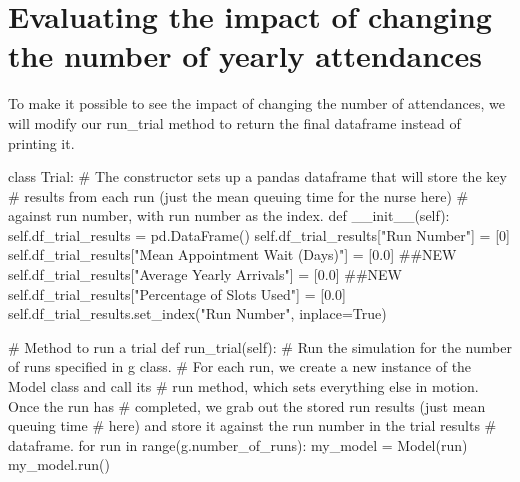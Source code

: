 \documentclass[
  letterpaper,
  DIV=11,
  numbers=noendperiod]{scrreprt}
\newenvironment{Shaded}{\begin{snugshade}}{\end{snugshade}}
\newcommand{\BuiltInTok}[1]{\textcolor[rgb]{0.00,0.23,0.31}{#1}}
\newcommand{\CommentTok}[1]{\textcolor[rgb]{0.37,0.37,0.37}{#1}}
\newcommand{\ControlFlowTok}[1]{\textcolor[rgb]{0.00,0.23,0.31}{#1}}
\newcommand{\DecValTok}[1]{\textcolor[rgb]{0.68,0.00,0.00}{#1}}
\newcommand{\FloatTok}[1]{\textcolor[rgb]{0.68,0.00,0.00}{#1}}
\newcommand{\FunctionTok}[1]{\textcolor[rgb]{0.28,0.35,0.67}{#1}}
\newcommand{\KeywordTok}[1]{\textcolor[rgb]{0.00,0.23,0.31}{#1}}
\newcommand{\NormalTok}[1]{\textcolor[rgb]{0.00,0.23,0.31}{#1}}
\newcommand{\OperatorTok}[1]{\textcolor[rgb]{0.37,0.37,0.37}{#1}}
\newcommand{\StringTok}[1]{\textcolor[rgb]{0.13,0.47,0.30}{#1}}
\newcommand{\VariableTok}[1]{\textcolor[rgb]{0.07,0.07,0.07}{#1}}
\begin{document}
\section{Evaluating the impact of changing the number of yearly
attendances}\label{evaluating-the-impact-of-changing-the-number-of-yearly-attendances}

To make it possible to see the impact of changing the number of
attendances, we will modify our run\_trial method to return the final
dataframe instead of printing it.

\begin{Shaded}
\begin{Highlighting}[]
\KeywordTok{class}\NormalTok{ Trial:}
    \CommentTok{\# The constructor sets up a pandas dataframe that will store the key}
    \CommentTok{\# results from each run (just the mean queuing time for the nurse here)}
    \CommentTok{\# against run number, with run number as the index.}
    \KeywordTok{def}  \FunctionTok{\_\_init\_\_}\NormalTok{(}\VariableTok{self}\NormalTok{):}
        \VariableTok{self}\NormalTok{.df\_trial\_results }\OperatorTok{=}\NormalTok{ pd.DataFrame()}
        \VariableTok{self}\NormalTok{.df\_trial\_results[}\StringTok{"Run Number"}\NormalTok{] }\OperatorTok{=}\NormalTok{ [}\DecValTok{0}\NormalTok{]}
        \VariableTok{self}\NormalTok{.df\_trial\_results[}\StringTok{"Mean Appointment Wait (Days)"}\NormalTok{] }\OperatorTok{=}\NormalTok{ [}\FloatTok{0.0}\NormalTok{] }\CommentTok{\#\#NEW}
        \VariableTok{self}\NormalTok{.df\_trial\_results[}\StringTok{"Average Yearly Arrivals"}\NormalTok{] }\OperatorTok{=}\NormalTok{ [}\FloatTok{0.0}\NormalTok{] }\CommentTok{\#\#NEW}
        \VariableTok{self}\NormalTok{.df\_trial\_results[}\StringTok{"Percentage of Slots Used"}\NormalTok{] }\OperatorTok{=}\NormalTok{ [}\FloatTok{0.0}\NormalTok{]}
        \VariableTok{self}\NormalTok{.df\_trial\_results.set\_index(}\StringTok{"Run Number"}\NormalTok{, inplace}\OperatorTok{=}\VariableTok{True}\NormalTok{)}

    \CommentTok{\# Method to run a trial}
    \KeywordTok{def}\NormalTok{ run\_trial(}\VariableTok{self}\NormalTok{):}
        \CommentTok{\# Run the simulation for the number of runs specified in g class.}
        \CommentTok{\# For each run, we create a new instance of the Model class and call its}
        \CommentTok{\# run method, which sets everything else in motion.  Once the run has}
        \CommentTok{\# completed, we grab out the stored run results (just mean queuing time}
        \CommentTok{\# here) and store it against the run number in the trial results}
        \CommentTok{\# dataframe.}
        \ControlFlowTok{for}\NormalTok{ run }\KeywordTok{in} \BuiltInTok{range}\NormalTok{(g.number\_of\_runs):}
\NormalTok{            my\_model }\OperatorTok{=}\NormalTok{ Model(run)}
\NormalTok{            my\_model.run()}


\end{Highlighting}
\end{Shaded}
\end{document}

